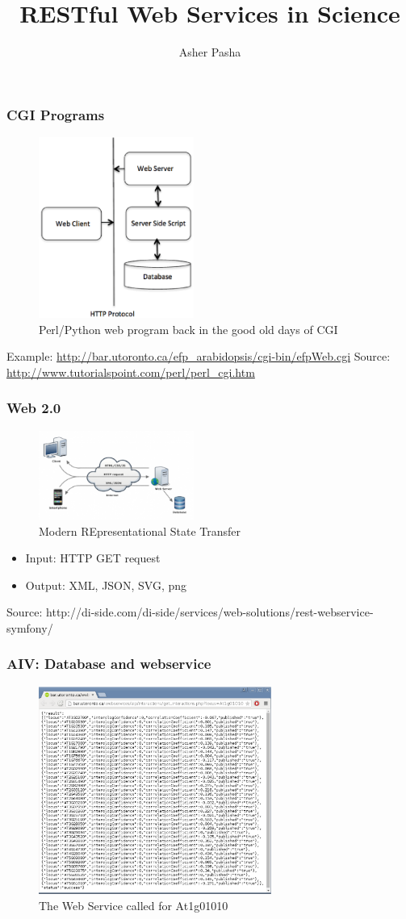 \documentclass{beamer}
\title{RESTful Web Services in Science}
\author{Asher Pasha}
\institute{University of Toronto}
\begin{document}
	\frame{\titlepage}

	\begin{frame}
		\frametitle{CGI Programs}
		\begin{figure}[!htb]
			\centering
			\includegraphics[width=2in]{cgiarch.eps}
			\caption{Perl/Python web program back in the good old days of CGI}
		\end{figure}
		Example: \url{http://bar.utoronto.ca/efp\_arabidopsis/cgi-bin/efpWeb.cgi}
		{\tiny Source: \url{http://www.tutorialspoint.com/perl/perl\_cgi.htm}}			
	\end{frame}

	\begin{frame}
		\frametitle{Web 2.0}
		\begin{figure}[!htb]
			\centering
			\includegraphics[width=2in]{REST.eps}
			\caption{Modern REpresentational State Transfer}
		\end{figure}
		\begin{itemize}
			\item Input: HTTP GET request
			\item Output: XML, JSON, SVG, png
		\end{itemize}
		{\tiny Source: http://di-side.com/di-side/services/web-solutions/rest-webservice-symfony/}			
	\end{frame}

	\begin{frame}
		\frametitle{AIV: Database and webservice}
		\begin{figure}[!htb]
			\centering
			\includegraphics[width=3in]{webservice.eps}
			\caption{The Web Service called for At1g01010}
		\end{figure}
	\end{frame}
\end{document}
